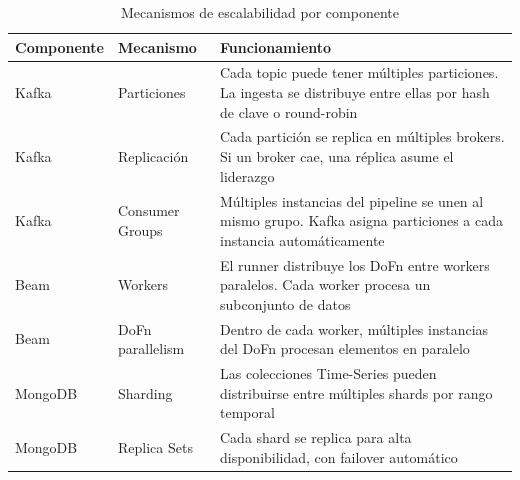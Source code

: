 \documentclass[12pt,a4paper]{article}
\begin{document}
\begin{table}[H]
    \centering
    \caption{Mecanismos de escalabilidad por componente}
    \begin{tabular}{@{}llp{8cm}@{}}
        \toprule
        \textbf{Componente} & \textbf{Mecanismo} & \textbf{Funcionamiento}                                                                                             \\
        \midrule
        Kafka               & Particiones        & Cada topic puede tener múltiples particiones. La ingesta se distribuye entre ellas por hash de clave o round-robin  \\
        Kafka               & Replicación        & Cada partición se replica en múltiples brokers. Si un broker cae, una réplica asume el liderazgo                    \\
        Kafka               & Consumer Groups    & Múltiples instancias del pipeline se unen al mismo grupo. Kafka asigna particiones a cada instancia automáticamente \\
        Beam                & Workers            & El runner distribuye los DoFn entre workers paralelos. Cada worker procesa un subconjunto de datos                  \\
        Beam                & DoFn parallelism   & Dentro de cada worker, múltiples instancias del DoFn procesan elementos en paralelo                                 \\
        MongoDB             & Sharding           & Las colecciones Time-Series pueden distribuirse entre múltiples shards por rango temporal                           \\
        MongoDB             & Replica Sets       & Cada shard se replica para alta disponibilidad, con failover automático                                             \\
        \bottomrule
    \end{tabular}
\end{table}
\end{document}
